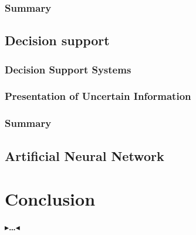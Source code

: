 \documentclass[twoside,11pt,openright]{report}
\newcommand{\todo}[1]{{\color[rgb]{.5,0,0}\textbf{$\blacktriangleright$#1$\blacktriangleleft$}}}
\begin{document}
\subsection{Summary}

\newpage
\section{Decision support}
\subsection{Decision Support Systems}

\subsection{Presentation of Uncertain Information}

\subsection{Summary}


\section{Artificial Neural Network}





\chapter{Conclusion}
\label{ch:conclusion}

\todo{\dots}



 

\end{document}

